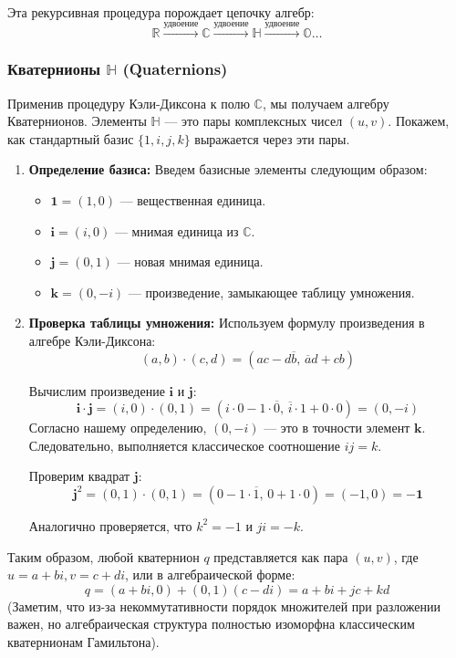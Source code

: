 \documentclass[11pt, a4paper]{extarticle}
\newcommand{\R}{{\mathbb R}}
\newcommand{\C}{{\mathbb C}}
\renewcommand{\bar}[1]{\overline{#1}}
\begin{document}
Эта рекурсивная процедура порождает цепочку алгебр:
$$ \R \xrightarrow{\text{удвоение}} \C \xrightarrow{\text{удвоение}} \mathbb{H} \xrightarrow{\text{удвоение}} \mathbb{O} \dots $$

\subsubsection{Кватернионы $\mathbb{H}$ (Quaternions)}

Применив процедуру Кэли-Диксона к полю $\C$, мы получаем алгебру Кватернионов.
Элементы $\mathbb{H}$ — это пары комплексных чисел $(u, v)$.
Покажем, как стандартный базис $\{1, i, j, k\}$ выражается через эти пары.

\begin{enumerate}
    \item \textbf{Определение базиса:}
    Введем базисные элементы следующим образом:
    \begin{itemize}
        \item $\mathbf{1} = (1, 0)$ — вещественная единица.
        \item $\mathbf{i} = (i, 0)$ — мнимая единица из $\C$.
        \item $\mathbf{j} = (0, 1)$ — новая мнимая единица.
        \item $\mathbf{k} = (0, -i)$ — произведение, замыкающее таблицу умножения.
    \end{itemize}
    
    \item \textbf{Проверка таблицы умножения:}
    Используем формулу произведения в алгебре Кэли-Диксона: 
    $$(a, b) \cdot (c, d) = (ac - d\bar{b}, \, \bar{a}d + cb)$$
    
    Вычислим произведение $\mathbf{i}$ и $\mathbf{j}$:
    $$ \mathbf{i} \cdot \mathbf{j} = (i, 0) \cdot (0, 1) = (i\cdot 0 - 1\cdot \bar{0}, \, \bar{i}\cdot 1 + 0\cdot 0) = (0, -i) $$
    Согласно нашему определению, $(0, -i)$ — это в точности элемент $\mathbf{k}$.
    Следовательно, выполняется классическое соотношение $ij = k$.
    
    Проверим квадрат $\mathbf{j}$:
    $$ \mathbf{j}^2 = (0, 1) \cdot (0, 1) = (0 - 1\cdot \bar{1}, \, 0 + 1\cdot 0) = (-1, 0) = -\mathbf{1} $$
    
    Аналогично проверяется, что $k^2 = -1$ и $ji = -k$.
\end{enumerate}

Таким образом, любой кватернион $q$ представляется как пара $(u, v)$, где $u=a+bi, v=c+di$, или в алгебраической форме:
$$ q = (a+bi, 0) + (0, 1)(c-di) = a+bi + jc + kd $$
(Заметим, что из-за некоммутативности порядок множителей при разложении важен, но алгебраическая структура полностью изоморфна классическим кватернионам Гамильтона).
\end{document}
